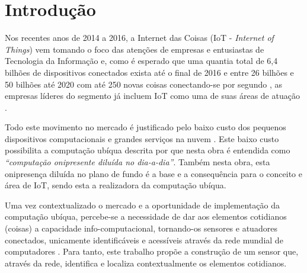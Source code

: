 \chapter[Introdução]{Introdução}

Nos recentes anos de 2014 a 2016, a Internet das Coisas (IoT - \emph{Internet of
Things}) vem tomando o foco das atenções de empresas e entusiastas de Tecnologia
da Informação \cite{DzoneIoT:2015} e, como é esperado que uma quantia total de
6,4 bilhões de dispositivos conectados exista até o final de 2016
\cite{GARTNER2015} e entre 26 bilhões \cite{GARTNER2014} e 50 bilhões até 2020
com até 250 novas coisas conectando-se por segundo \cite{CiscoBlog2013}, as
empresas líderes do segmento já incluem IoT como uma de suas áreas de atuação
\cite{Ibm2016, ARM-mbed, Microsoft2016, Intel2016, Oracle2016, Google2016,
AmazonIoT2016}.

Todo este movimento no mercado é justificado pelo baixo custo dos pequenos
dispositivos computacionais \cite{RpiZeroLaunch, Esp8266.net} e grandes serviços
na nuvem \cite{Kaufmann2015, Amazon2016}. Este baixo custo possibilita a
computação ubíqua descrita por  que nesta obra é
entendida como \emph{``computação onipresente diluída no dia-a-dia''}. Também
nesta obra, esta onipresença diluída no plano de fundo é a  base e a
consequência para o conceito e área de IoT, sendo esta a realizadora da
computação ubíqua.

Uma vez contextualizado o mercado e a oportunidade de implementação da
computação ubíqua, percebe-se a necessidade de dar aos elementos cotidianos
(coisas) a capacidade info-computacional, tornando-os sensores e atuadores
conectados, unicamente identificáveis e acessíveis através da rede mundial de
computadores \cite{Lemos2013, Kranenburg2012}. Para tanto, este trabalho propõe
a construção de um sensor que, através da rede, identifica e localiza contextualmente
os elementos cotidianos.
